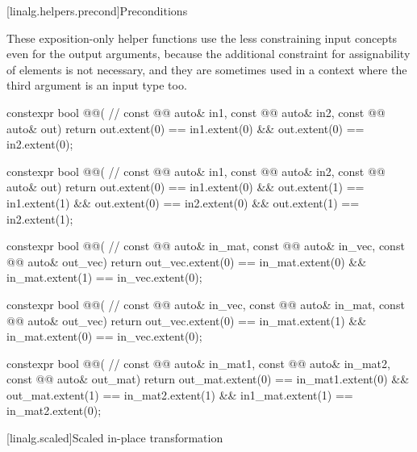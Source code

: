 [linalg.helpers.precond]{Preconditions}

\pnum
\begin{note}
These exposition-only helper functions use
the less constraining input concepts even for the output arguments,
because the additional constraint for assignability of elements
is not necessary, and
they are sometimes used in a context
where the third argument is an input type too.
\end{note}

\begin{codeblock}
constexpr bool @@(                                          // \expos
  const @@ auto& in1, const @@ auto& in2, const @@ auto& out) {
  return out.extent(0) == in1.extent(0) && out.extent(0) == in2.extent(0);
}

constexpr bool @@(                                          // \expos
  const @@ auto& in1,  const @@ auto& in2, const @@ auto& out) {
  return out.extent(0) == in1.extent(0) && out.extent(1) == in1.extent(1) &&
         out.extent(0) == in2.extent(0) && out.extent(1) == in2.extent(1);
}

constexpr bool @@(                                     // \expos
  const @@ auto& in_mat, const @@ auto& in_vec, const @@ auto& out_vec) {
  return out_vec.extent(0) == in_mat.extent(0) && in_mat.extent(1) == in_vec.extent(0);
}

constexpr bool @@( // \expos
  const @@ auto& in_vec, const @@ auto& in_mat, const @@ auto& out_vec) {
  return out_vec.extent(0) == in_mat.extent(1) && in_mat.extent(0) == in_vec.extent(0);
}

constexpr bool @@(                                     // \expos
  const @@ auto& in_mat1, const @@ auto& in_mat2, const @@ auto& out_mat) {
  return out_mat.extent(0) == in_mat1.extent(0) && out_mat.extent(1) == in_mat2.extent(1) &&
         in1_mat.extent(1) == in_mat2.extent(0);
}
\end{codeblock}

[linalg.scaled]{Scaled in-place transformation}

